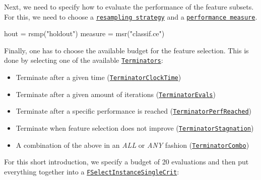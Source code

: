 \documentclass[
]{scrbook}
\newenvironment{Shaded}{\begin{snugshade}}{\end{snugshade}}
\newcommand{\AttributeTok}[1]{\textcolor[rgb]{0.77,0.63,0.00}{#1}}
\newcommand{\DecValTok}[1]{\textcolor[rgb]{0.00,0.00,0.81}{#1}}
\newcommand{\FunctionTok}[1]{\textcolor[rgb]{0.00,0.00,0.00}{#1}}
\newcommand{\NormalTok}[1]{#1}
\newcommand{\OtherTok}[1]{\textcolor[rgb]{0.56,0.35,0.01}{#1}}
\newcommand{\SpecialCharTok}[1]{\textcolor[rgb]{0.00,0.00,0.00}{#1}}
\newcommand{\StringTok}[1]{\textcolor[rgb]{0.31,0.60,0.02}{#1}}
\providecommand{\tightlist}{%
  \setlength{\itemsep}{0pt}\setlength{\parskip}{0pt}}
\renewenvironment{Shaded} {\begin{snugshade}\small} {\end{snugshade}}
\begin{document}
Next, we need to specify how to evaluate the performance of the feature subsets.
For this, we need to choose a \href{https://mlr3.mlr-org.com/reference/Resampling.html}{\texttt{resampling\ strategy}} and a \href{https://mlr3.mlr-org.com/reference/Measure.html}{\texttt{performance\ measure}}.

\begin{Shaded}
\begin{Highlighting}[]
\NormalTok{hout }\OtherTok{=} \FunctionTok{rsmp}\NormalTok{(}\StringTok{"holdout"}\NormalTok{)}
\NormalTok{measure }\OtherTok{=} \FunctionTok{msr}\NormalTok{(}\StringTok{"classif.ce"}\NormalTok{)}
\end{Highlighting}
\end{Shaded}

Finally, one has to choose the available budget for the feature selection.
This is done by selecting one of the available \href{https://bbotk.mlr-org.com/reference/Terminator.html}{\texttt{Terminators}}:

\begin{itemize}
\tightlist
\item
  Terminate after a given time (\href{https://bbotk.mlr-org.com/reference/mlr_terminators_clock_time.html}{\texttt{TerminatorClockTime}})
\item
  Terminate after a given amount of iterations (\href{https://bbotk.mlr-org.com/reference/mlr_terminators_evals.html}{\texttt{TerminatorEvals}})
\item
  Terminate after a specific performance is reached (\href{https://bbotk.mlr-org.com/reference/mlr_terminators_perf_reached.html}{\texttt{TerminatorPerfReached}})
\item
  Terminate when feature selection does not improve (\href{https://bbotk.mlr-org.com/reference/mlr_terminators_stagnation.html}{\texttt{TerminatorStagnation}})
\item
  A combination of the above in an \emph{ALL} or \emph{ANY} fashion (\href{https://bbotk.mlr-org.com/reference/mlr_terminators_combo.html}{\texttt{TerminatorCombo}})
\end{itemize}

For this short introduction, we specify a budget of 20 evaluations and then put everything together into a \href{https://mlr3fselect.mlr-org.com/reference/FSelectInstanceSingleCrit.html}{\texttt{FSelectInstanceSingleCrit}}:

\begin{Shaded}
\end{Shaded}
\end{document}
